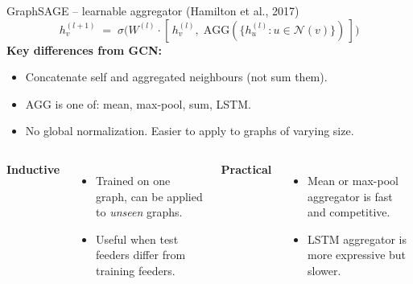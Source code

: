\documentclass[aspectratio=169,10pt]{beamer}
\begin{document}
\begin{frame}{GraphSAGE -- learnable aggregator (Hamilton et al., 2017)}
\begin{equation*}
h_v^{(l+1)} \;=\; \sigma\!\bigl( W^{(l)} \cdot [\, h_v^{(l)}, \;\text{AGG}(\{ h_u^{(l)} : u \in \mathcal{N}(v)\}) \,]\bigr)
\end{equation*}
\vspace{0.2em}
\textbf{Key differences from GCN:}
\begin{itemize}
  \item Concatenate self and aggregated neighbours (not sum them).
  \item AGG is one of: mean, max-pool, sum, LSTM.
  \item No global normalization. Easier to apply to graphs of varying size.
\end{itemize}
\vspace{0.4em}
\begin{columns}[T]
\textbf{Inductive}
\begin{itemize}
  \item Trained on one graph, can be applied to \emph{unseen} graphs.
  \item Useful when test feeders differ from training feeders.
\end{itemize}
\textbf{Practical}
\begin{itemize}
  \item Mean or max-pool aggregator is fast and competitive.
  \item LSTM aggregator is more expressive but slower.
\end{itemize}
\end{columns}
\end{frame}
\end{document}
